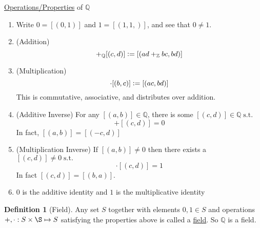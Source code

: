 \documentclass[12pt]{amsart}
\newcommand{\bbZ}{\mathbb{Z}}
\newcommand{\bbQ}{\mathbb{Q}}
\newcommand{\suchthat}{\operatorname{s.t.}}
\theoremstyle{plain}
\theoremstyle{remark}
\theoremstyle{definition}
\newtheorem*{define}{Definition}
\begin{document}
\par
\ul{Operations/Properties} of $\bbQ$ 
\begin{enumerate}
	\item 
		Write $0 = [(0,1)]$ and $1 = [(1,1,)]$, and see that $0\neq 1$.
	\item (Addition)
		\begin{equation*}
		[(a,b)] +_{\bbQ} [(c,d)] \vcentcolon = [(ad +_{\bbZ} bc, bd)]
		\end{equation*}
	\item (Multiplication)
		\begin{equation*}
			[(a,b)]\cdot [(b,c)] \vcentcolon = [(ac,bd)]
		\end{equation*}
		This is commutative, associative, and distributes over addition.
	\item (Additive Inverse)
		For any $[(a,b)]\in \bbQ$, there is some $[(c,d)] \in \bbQ \suchthat$ 
		\begin{equation*}
		[(a,b)] + [(c,d)] = 0 
		\end{equation*}
		In fact, $[(a,b)] = [(-c,d)]$
	\item (Multiplication Inverse)
		If $[(a,b)] \neq 0$ then there exists a $[(c,d)] \neq 0 \suchthat$ 
		\begin{equation*}
			[(a,b)] \cdot [(c,d)] = 1
		\end{equation*}
		In fact $[(c,d)] = [(b,a)]$. 
	\item
		$0$ is the additive identity and $1$ is the multiplicative identity
\end{enumerate}

\begin{define}[Field]
	Any set $S$ together with elements $0,1 \in S$ and operations $+,\cdot:S \times \S \mapsto S$ satisfying the properties above is called a \ul{field}. So $\bbQ$ is a field.
\end{define}
\end{document}
